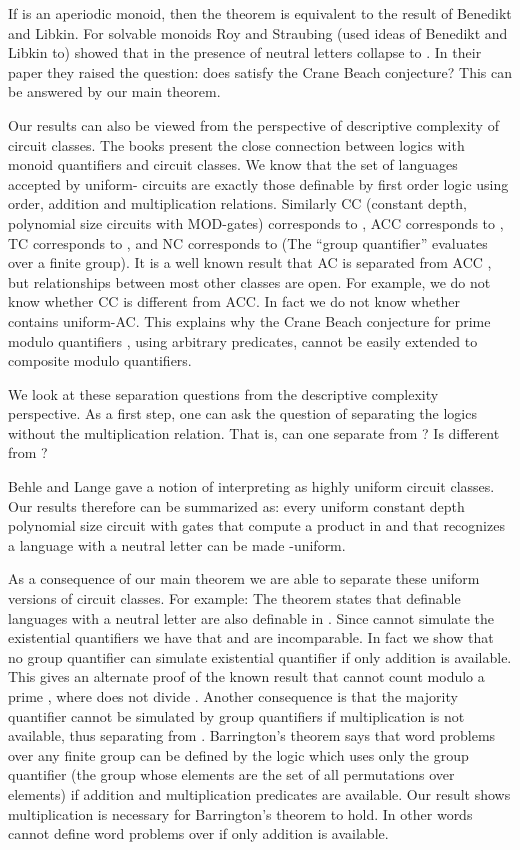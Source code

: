 \documentclass[envcountsame]{llncs}
\begin{document}
If  is an aperiodic monoid, then the theorem is equivalent to the result of Benedikt and Libkin. 
For solvable monoids Roy and Straubing \cite{roy_defGenFO} 
(used ideas of Benedikt and Libkin to) showed that in the presence of neutral letters   collapse to
. In their paper they raised the question: does  satisfy the Crane Beach conjecture?
This can be answered by our main theorem.

Our results can also be viewed from the perspective of descriptive complexity of circuit classes. The books
\cite{immerman_book, vollmer_book} present the close connection between logics with monoid quantifiers and circuit classes. 
We know that the set of languages accepted by uniform- circuits
are exactly those definable by first order logic using order,
addition and multiplication relations. Similarly CC (constant depth, polynomial size circuits with MOD-gates)
corresponds to , ACC corresponds to , TC corresponds to , 
and NC corresponds to  (The ``group quantifier'' evaluates
over a finite group). It is a well known result that AC is separated from ACC \cite{furst_parity}, but relationships between 
most other classes are open. For example, we do not know whether CC is different from ACC. In fact we do not know whether
 contains uniform-AC. This explains why the Crane Beach conjecture for prime modulo quantifiers \cite{ltt06}, using
arbitrary predicates, cannot be easily extended to composite modulo quantifiers.

We look at these separation questions from the descriptive complexity
perspective. As a first step, one can ask the
question of separating the logics without the multiplication
relation. That is, can one separate  from
? Is  different from ? 

Behle and Lange \cite{behle_foLessUniform} gave a notion of interpreting  as highly uniform circuit classes.  Our results therefore can be summarized as: every  uniform constant depth polynomial size circuit with gates that compute a product in  and that recognizes a language with a neutral letter can be made -uniform.

As a consequence of our main theorem we are able to separate these uniform versions of circuit classes.
For example: The theorem states that  definable languages with a neutral letter are also definable in . Since  cannot simulate the existential quantifiers \cite{str_cirBook} we have that  and  are incomparable. In fact we show that no group quantifier can simulate existential quantifier if only addition is available.
This gives an alternate proof of the known result \cite{roy_defGenFO} that  cannot count modulo a
prime , where  does not divide . 
Another consequence is that the majority quantifier cannot be simulated by group quantifiers if multiplication is not available, thus
separating  from . Barrington's theorem \cite{barr_NC1} says that word problems over any finite group can be defined by the logic which 
uses only the  group quantifier (the group whose elements are the set of all permutations over  elements) if addition and multiplication predicates are available.
Our result shows multiplication is necessary for Barrington's theorem to hold. In other words  cannot define word problems over
 if only addition is available. 
\end{document}
